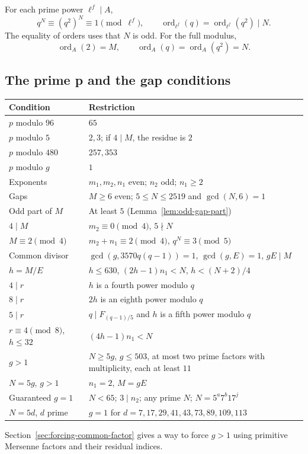\documentclass[11pt]{article}
\begin{document}
For each prime power $\ell^f\mid A$,
\[
q^N\equiv(q^2)^N\equiv1\pmod{\ell^f},\qquad
\operatorname{ord}_{\ell^f}(q)
=\operatorname{ord}_{\ell^f}(q^2)\mid N.
\]
The equality of orders uses that $N$ is odd. For the full modulus,
\[
\operatorname{ord}_A(2)=M,\qquad
\operatorname{ord}_A(q)=\operatorname{ord}_A(q^2)=N.
\]

\subsection{The prime p and the gap conditions}
{\small\renewcommand{\arraystretch}{1.15}
\begin{longtable}{@{}p{}p{}@{}}
\textbf{Condition}&\textbf{Restriction}\\\hline
\endhead
$p$ modulo $96$&$65$\\
$p$ modulo $5$&$2,3$; if $4\mid M$, the residue is $2$\\
$p$ modulo $480$&$257,353$\\
$p$ modulo $g$&$1$\\\hline
Exponents&$m_1,m_2,n_1$ even; $n_2$ odd; $n_1\ge2$\\
Gaps&$M\ge6$ even; $5\le N\le2519$ and $\gcd(N,6)=1$\\
Odd part of $M$&At least $5$ (Lemma~\ref{lem:odd-gap-part})\\
$4\mid M$&$m_2\equiv0\pmod4$, $5\nmid N$\\
$M\equiv2\pmod4$&$m_2+n_1\equiv2\pmod4$, $q^N\equiv3\pmod5$\\
Common divisor&$\gcd(g,3570q(q-1))=1$, $\gcd(g,E)=1$, $gE\mid M$\\
$h=M/E$&$h\le630$, $(2h-1)n_1<N$, $h<(N+2)/4$\\
$4\mid r$&$h$ is a fourth power modulo $q$\\
$8\mid r$&$2h$ is an eighth power modulo $q$\\
$5\mid r$&$q\mid F_{(q-1)/5}$ and $h$ is a fifth power modulo $q$\\
$r\equiv4\pmod8$, $h\le32$&$(4h-1)n_1<N$\\
$g>1$&$N\ge5g$, $g\le503$, at most two prime factors with
multiplicity, each at least $11$\\
$N=5g$, $g>1$&$n_1=2$, $M=gE$\\
Guaranteed $g=1$&$N<65$; $3\mid n_2$; any prime $N$; $N=5^a7^b17^j$\\
$N=5d$, $d$ prime&$g=1$ for $d=7,17,29,41,43,73,89,109,113$\\\hline
\end{longtable}}
Section~\ref{sec:forcing-common-factor} gives a way to force $g>1$
using primitive Mersenne factors and their residual indices.
\end{document}
